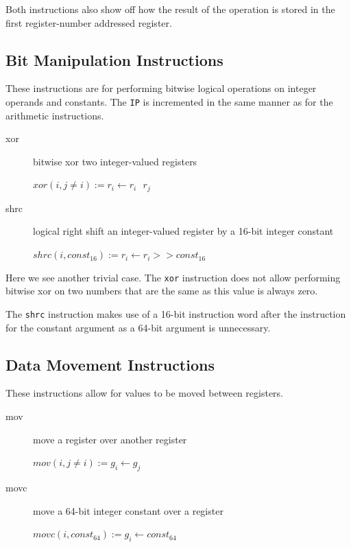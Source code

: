 \documentclass[english,a4paper]{report}
\begin{document}
Both instructions also show off how the result of the operation is stored in the first register-number addressed register.

\subsection{Bit Manipulation Instructions}

These instructions are for performing bitwise logical operations on
integer operands and constants. The \verb|IP| is incremented in the
same manner as for the arithmetic instructions.

\begin{description}
	\item[xor] bitwise xor two integer-valued registers
	
	$xor(i, j \neq i) := r _{i} \longleftarrow  r _{i} \textbf{ \^{} 
	} r _{j} $ \\
	
	\item[shrc] logical right shift an integer-valued register by a 
	16-bit
	integer constant
	
	$shrc(i, const _{16}) :=  r _{i} \longleftarrow  r _{i} >> const 
	_{16} $ \\	
\end{description}

Here we see another trivial case. The \verb|xor| instruction does not allow performing bitwise xor on two numbers that are the same as this value is always zero.

The \verb|shrc| instruction makes use of a 16-bit instruction word after the instruction for the constant argument as a 64-bit argument is unnecessary. 

\subsection{Data Movement Instructions}
These instructions allow for values to be moved between registers.

\begin{description}
	\item[mov] move a register over another register
	
	$mov(i, j \neq i) := g_{i} \longleftarrow g_{j} $ \\
	\item[movc] move a 64-bit integer constant over a register
	
	$movc(i, const_{64}):= g_{i} \longleftarrow const_{64} $ \\
\end{description}
\end{document}
